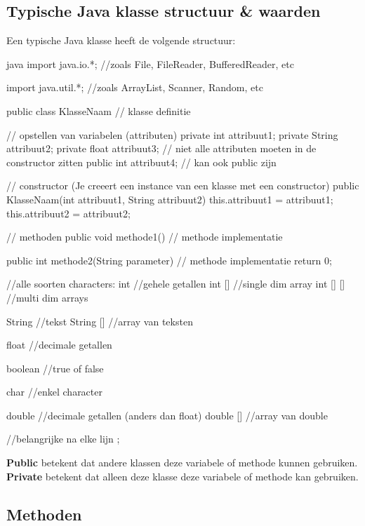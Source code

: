 \documentclass[a4paper,11pt]{article}
\begin{document}
\subsection{Typische Java klasse structuur \& waarden}
Een typische Java klasse heeft de volgende structuur:
\begin{codeblock}{java}
    import java.io.*; //zoals File, FileReader, BufferedReader, etc

    import java.util.*; //zoals ArrayList, Scanner, Random, etc
    

    public class KlasseNaam  // klasse definitie
    {
        // opstellen van variabelen (attributen)
        private int attribuut1;
        private String attribuut2;
        private float attribuut3; // niet alle attributen moeten in de constructor zitten
        public int attribuut4; // kan ook public zijn 

        // constructor (Je creeert een instance van een klasse met een constructor)
        public KlasseNaam(int attribuut1, String attribuut2) 
        {
            this.attribuut1 = attribuut1;
            this.attribuut2 = attribuut2;
        }

        // methoden
        public void methode1() 
        {
            // methode implementatie
        }

        public int methode2(String parameter) 
        {
            // methode implementatie
            return 0;
        }

        //alle soorten characters:
        int //gehele getallen
        int [] //single dim array
        int [] [] //multi dim arrays

        String //tekst
        String [] //array van teksten

        float //decimale getallen

        boolean //true of false

        char //enkel character

        double //decimale getallen (anders dan float)
        double [] //array van double

        //belangrijke na elke lijn ;
    }
\end{codeblock}

\textbf{Public} betekent dat andere klassen deze variabele of methode
 kunnen gebruiken.
\textbf{Private} betekent dat alleen deze klasse deze variabele of methode 
kan gebruiken.

\subsection{Methoden}
\end{document}

